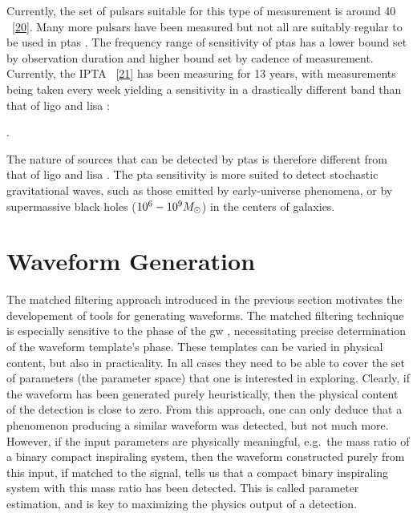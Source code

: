 \documentclass[
  11pt,
  a4paper,
  DIV=11,
  numbers=noendperiod,
  twoside]{scrreprt}
\let\[\relax \let\]\relax %
\DeclareRobustCommand{\[}{\begin{equation}}
\DeclareRobustCommand{\]}{\end{equation}}
\begin{document}
Currently, the set of pulsars suitable for this type of measurement is
around 40 ~{[}\protect\hyperlink{ref-Maiorano:2021}{20}{]}. Many more
pulsars have been measured but not all are suitably regular to be used
in \glspl{pta} . The frequency range of sensitivity of \glspl{pta} has a
lower bound set by observation duration and higher bound set by cadence
of measurement. Currently, the IPTA
~{[}\protect\hyperlink{ref-Hobbs:2009yy}{21}{]} has been measuring for
13 years, with measurements being taken every week yielding a
sensitivity in a drastically different band than that of \gls{ligo} and
\gls{lisa} :

\[
.
\]

The nature of sources that can be detected by \glspl{pta} is therefore
different from that of \gls{ligo} and \gls{lisa} . The \gls{pta}
sensitivity is more suited to detect stochastic gravitational waves,
such as those emitted by early-universe phenomena, or by supermassive
black holes (\(10^6-10^9M_\odot\)) in the centers of
galaxies.


\hypertarget{sec-wfgen}{%
\chapter{Waveform Generation}\label{sec-wfgen}}

The matched filtering approach introduced in the previous section
motivates the developement of tools for generating waveforms. The
matched filtering technique is especially sensitive to the phase of the
\gls{gw} , necessitating precise determination of the waveform
template's phase. These templates can be varied in physical content, but
also in practicality. In all cases they need to be able to cover the set
of parameters (the parameter space) that one is interested in exploring.
Clearly, if the waveform has been generated purely heuristically, then
the physical content of the detection is close to zero. From this
approach, one can only deduce that a phenomenon producing a similar
waveform was detected, but not much more. However, if the input
parameters are physically meaningful, e.g.~the mass ratio of a binary
compact inspiraling system, then the waveform constructed purely from
this input, if matched to the signal, tells us that a compact binary
inspiraling system with this mass ratio has been detected. This is
called parameter estimation, and is key to maximizing the physics output
of a detection.
\end{document}
